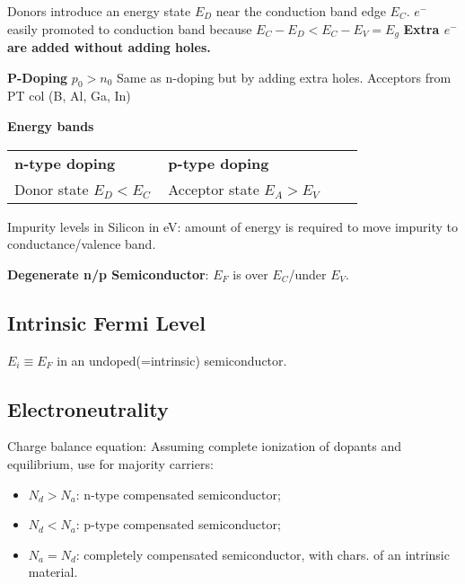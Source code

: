 \documentclass[a4paper, fontsize=8pt, landscape, DIV=1]{scrartcl}
\begin{document}
\begin{multicols*}{4}
  Donors introduce an energy state $E_D$ near the conduction band edge $E_C$. $e^-$ easily promoted to conduction band because $E_C-E_D<E_C-E_V=E_g$ \textbf{Extra $e^-$ are added without adding holes.}

  \textbf{P-Doping} $p_0>n_0$
  Same as n-doping but by adding extra holes. Acceptors from PT col  (B, Al, Ga, In)

  \textbf{Energy bands}
    \begin{tabular}[h]{p{0.43\linewidth} | p{0.55\linewidth}}
    \textbf{n-type doping} & \textbf{p-type doping} \\
    Donor state $E_D<E_C$ & Acceptor state $E_A>E_V$ \\

  \end{tabular}

  Impurity levels in Silicon in eV: amount of energy is required to move impurity to conductance/valence band.
  
  \textbf{Degenerate n/p Semiconductor}: $E_F$ is over $E_C$/under $E_V$.
\subsection{Intrinsic Fermi Level}
$E_i\equiv E_F$ in an undoped(=intrinsic) semiconductor.





\subsection{Electroneutrality}
Charge balance equation:
Assuming complete ionization of dopants and equilibrium, use for majority carriers:
\begin{itemize}[nolistsep,noitemsep]
	\item $N_d>N_a$: n-type compensated semiconductor;
	\item $N_d<N_a$: p-type compensated semiconductor;
	\item $N_a=N_d$: completely compensated semiconductor, with chars. of an intrinsic material.
\end{itemize}

\end{multicols*}
\end{document}

